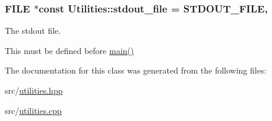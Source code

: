 \subsubsection[{\texorpdfstring{stdout\+\_\+file}{stdout_file}}]{\setlength{\rightskip}{0pt plus 5cm}F\+I\+LE $\ast$const Utilities\+::stdout\+\_\+file = {\bf S\+T\+D\+O\+U\+T\+\_\+\+F\+I\+LE}\hspace{0.3cm}{\ttfamily [static]}, {\ttfamily [private]}}\hypertarget{class_utilities_a224eea0a234ac9877a8334f74fc89ef0}{}\label{class_utilities_a224eea0a234ac9877a8334f74fc89ef0}


The stdout file. 

This must be defined before \hyperlink{shadow__stack_8cpp_a0ddf1224851353fc92bfbff6f499fa97}{main()} 

The documentation for this class was generated from the following files\+:\begin{DoxyCompactItemize}
\item 
src/\hyperlink{utilities_8hpp}{utilities.\+hpp}\item 
src/\hyperlink{utilities_8cpp}{utilities.\+cpp}\end{DoxyCompactItemize}
